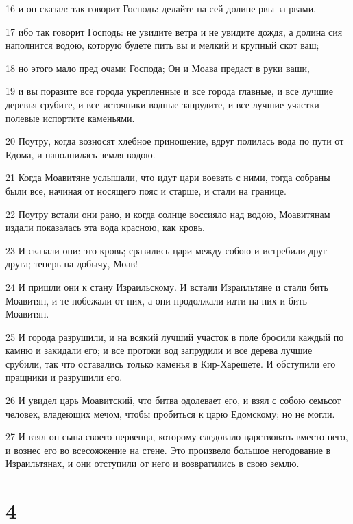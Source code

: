 \par 16 и он сказал: так говорит Господь: делайте на сей долине рвы за рвами,
\par 17 ибо так говорит Господь: не увидите ветра и не увидите дождя, а долина сия наполнится водою, которую будете пить вы и мелкий и крупный скот ваш;
\par 18 но этого мало пред очами Господа; Он и Моава предаст в руки ваши,
\par 19 и вы поразите все города укрепленные и все города главные, и все лучшие деревья срубите, и все источники водные запрудите, и все лучшие участки полевые испортите каменьями.
\par 20 Поутру, когда возносят хлебное приношение, вдруг полилась вода по пути от Едома, и наполнилась земля водою.
\par 21 Когда Моавитяне услышали, что идут цари воевать с ними, тогда собраны были все, начиная от носящего пояс и старше, и стали на границе.
\par 22 Поутру встали они рано, и когда солнце воссияло над водою, Моавитянам издали показалась эта вода красною, как кровь.
\par 23 И сказали они: это кровь; сразились цари между собою и истребили друг друга; теперь на добычу, Моав!
\par 24 И пришли они к стану Израильскому. И встали Израильтяне и стали бить Моавитян, и те побежали от них, а они продолжали идти на них и бить Моавитян.
\par 25 И города разрушили, и на всякий лучший участок в поле бросили каждый по камню и закидали его; и все протоки вод запрудили и все дерева лучшие срубили, так что оставались только каменья в Кир-Харешете. И обступили его пращники и разрушили его.
\par 26 И увидел царь Моавитский, что битва одолевает его, и взял с собою семьсот человек, владеющих мечом, чтобы пробиться к царю Едомскому; но не могли.
\par 27 И взял он сына своего первенца, которому следовало царствовать вместо него, и вознес его во всесожжение на стене. Это произвело большое негодование в Израильтянах, и они отступили от него и возвратились в свою землю.

\chapter{4}

